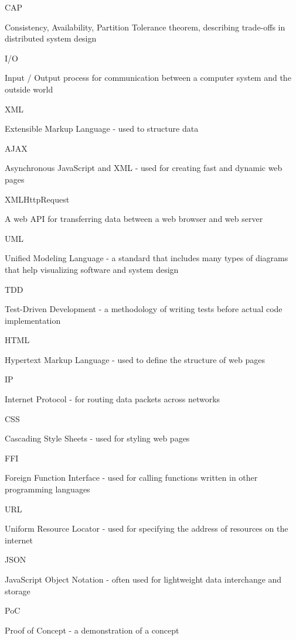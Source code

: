 \documentclass[]{interim}
\begin{document}
CAP

Consistency, Availability, Partition Tolerance theorem, describing trade-offs in distributed system design

I/O

Input / Output process for communication between a computer system and the outside world

XML

Extensible Markup Language - used to structure data

AJAX

Asynchronous JavaScript and XML - used for creating fast and dynamic web pages

XMLHttpRequest

A web API for transferring data between a web browser and web server

UML

Unified Modeling Language - a standard that includes many types of diagrams that help visualizing software and system design

TDD

Test-Driven Development - a methodology of writing tests before actual code implementation

HTML

Hypertext Markup Language - used to define the structure of web pages

IP

Internet Protocol - for routing data packets across networks

CSS

Cascading Style Sheets - used for styling web pages

FFI

Foreign Function Interface - used for calling functions written in other programming languages

URL

Uniform Resource Locator - used for specifying the address of resources on the internet

JSON

JavaScript Object Notation - often used for lightweight data interchange and storage

PoC

Proof of Concept - a demonstration of a concept
\end{document}
